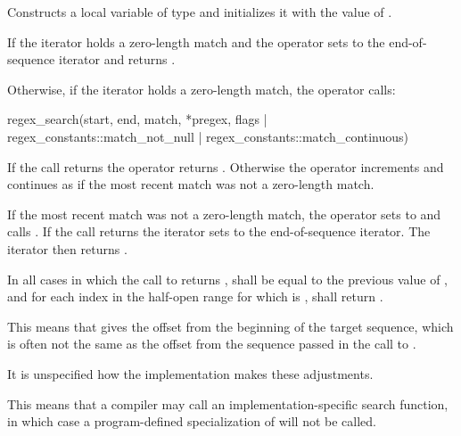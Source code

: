 \begin{itemdescr}
\pnum
\effects
Constructs a local variable  of type  and
initializes it with the value of .

\pnum
If the iterator holds a zero-length match and  the operator
sets  to the end-of-sequence iterator and returns .

\pnum
{}%
%
Otherwise, if the iterator holds a zero-length match, the operator calls:
\begin{codeblock}
regex_search(start, end, match, *pregex,
             flags | regex_constants::match_not_null | regex_constants::match_continuous)
\end{codeblock}
If the call returns  the operator
returns . Otherwise the operator increments  and continues as if
the most recent match was not a zero-length match.

\pnum
{}%
If the most recent match was not a zero-length match, the operator sets
 to  and
calls . If the call returns
 the iterator sets  to the end-of-sequence iterator. The
iterator then returns .

\pnum
In all cases in which the call to  returns ,
 shall be equal to the previous value of
, and for each index  in the half-open range
 for which  is ,
shall return .

\pnum
\begin{note}
This means that  gives the
offset from the beginning of the target sequence, which is often not
the same as the offset from the sequence passed in the call
to .
\end{note}

\pnum
It is unspecified how the implementation makes these adjustments.

\pnum
\begin{note}
This means that a compiler may call an
implementation-specific search function, in which case a program-defined
specialization of  will not be
called.
\end{note}
\end{itemdescr}

